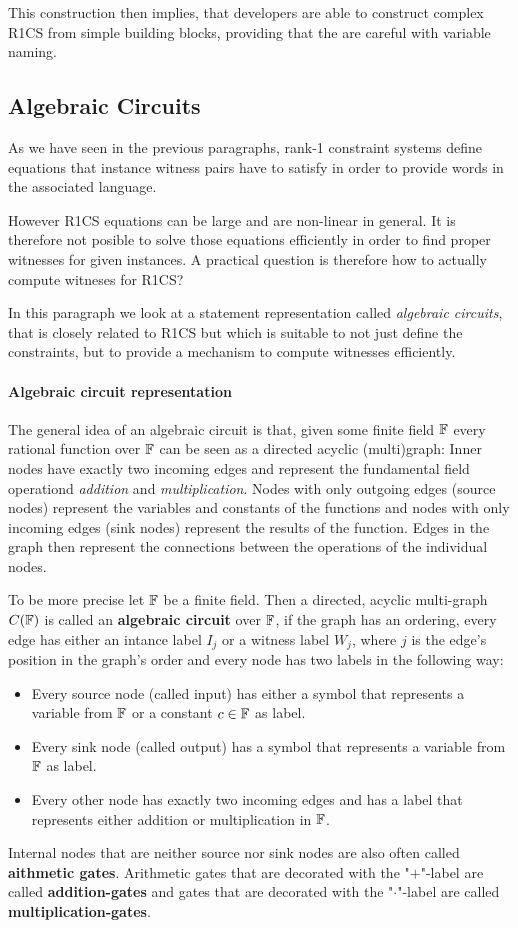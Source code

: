 This construction then implies, that developers are able to construct complex R1CS from simple building blocks, providing that the are careful with variable naming. 

\subsection{Algebraic Circuits} As we have seen in the previous paragraphs, rank-1 constraint systems define equations that instance witness pairs have to satisfy in order to provide words in the associated language.

However R1CS equations can be large and are non-linear in general. It is therefore not posible to solve those equations efficiently in order to find proper witnesses for given instances. A practical question is therefore how to actually compute witneses for R1CS?

In this paragraph we look at a statement representation called \textit{algebraic circuits}, that is closely related to R1CS but which is suitable to not just define the constraints, but to provide a mechanism to compute witnesses efficiently.

\paragraph{Algebraic circuit representation}
The general idea of an algebraic circuit is that, given some finite field $\mathbb{F}$ every rational function over $\mathbb{F}$ can be seen as a directed acyclic (multi)graph: Inner nodes have exactly two incoming edges and represent the fundamental field operationd \textit{addition} and \textit{multiplication}. Nodes with only outgoing edges (source nodes) represent the variables and constants of the functions and nodes with only incoming edges (sink nodes) represent the results of the function. Edges in the graph then represent the connections between the operations of the individual nodes.

To be more precise let $\mathbb{F}$ be a finite field. Then a directed, acyclic multi-graph $C(\mathbb{F})$ is called an \textbf{algebraic circuit} over $\mathbb{F}$, if the graph has an ordering, every edge has either an intance label $I_j$ or a witness label $W_j$, where $j$ is the edge's position in the graph's order and every node has two labels in the following way:
\begin{itemize}
\item Every source node (called input) has either a symbol that represents a variable from $\mathbb{F}$ or a constant $c\in\mathbb{F}$ as label.
\item Every sink node (called output) has a symbol that represents a variable from $\mathbb{F}$ as label.
\item Every other node has exactly two incoming edges and has a label that represents either addition or multiplication in $\mathbb{F}$.
\end{itemize}
Internal nodes that are neither source nor sink nodes are also often called \textbf{aithmetic gates}. Arithmetic gates that are decorated with the "$+$"-label are called \textbf{addition-gates} and gates that are decorated with the "$\cdot$"-label are called \textbf{multiplication-gates}.

